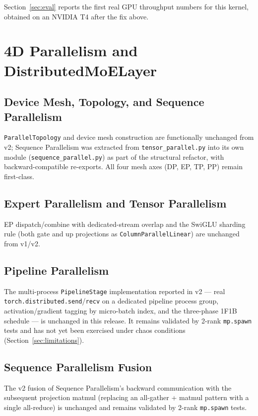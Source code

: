 \documentclass[11pt]{article}
\begin{document}
Section~\ref{sec:eval} reports the first real GPU throughput numbers for
this kernel, obtained on an NVIDIA T4 after the fix above.

\section{4D Parallelism and DistributedMoELayer}

\subsection{Device Mesh, Topology, and Sequence Parallelism}

\texttt{ParallelTopology} and device mesh construction are functionally
unchanged from v2; Sequence Parallelism was extracted from
\texttt{tensor\_parallel.py} into its own module
(\texttt{sequence\_parallel.py}) as part of the structural refactor, with
backward-compatible re-exports. All four mesh axes (DP, EP, TP, PP) remain
first-class.

\subsection{Expert Parallelism and Tensor Parallelism}

EP dispatch/combine with dedicated-stream overlap and the SwiGLU sharding
rule (both gate and up projections as \texttt{ColumnParallelLinear}) are
unchanged from v1/v2.

\subsection{Pipeline Parallelism}

The multi-process \texttt{PipelineStage} implementation reported in v2 ---
real \texttt{torch.distributed.send}/\texttt{recv} on a dedicated pipeline
process group, activation/gradient tagging by micro-batch index, and the
three-phase 1F1B schedule --- is unchanged in this release. It remains
validated by 2-rank \texttt{mp.spawn} tests and has not yet been exercised
under chaos conditions (Section~\ref{sec:limitations}).

\subsection{Sequence Parallelism Fusion}

The v2 fusion of Sequence Parallelism's backward communication with the
subsequent projection matmul (replacing an all-gather + matmul pattern with
a single all-reduce) is unchanged and remains validated by 2-rank
\texttt{mp.spawn} tests.
\end{document}
